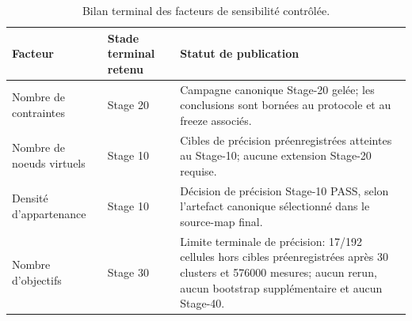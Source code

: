 \begin{table}[t]
\centering
\caption{Bilan terminal des facteurs de sensibilité contrôlée.}
\label{tab:sensitivity-final}
\small
\begin{tabular}{p{}p{}p{}}
\hline
Facteur & Stade terminal retenu & Statut de publication \\
\hline
Nombre de contraintes
& Stage 20
& Campagne canonique Stage-20 gelée; les conclusions sont bornées au protocole et au freeze associés. \\

Nombre de noeuds virtuels
& Stage 10
& Cibles de précision préenregistrées atteintes au Stage-10; aucune extension Stage-20 requise. \\

Densité d'appartenance
& Stage 10
& Décision de précision Stage-10 PASS, selon l'artefact canonique sélectionné dans le source-map final. \\

Nombre d'objectifs
& Stage 30
& Limite terminale de précision: 17/192 cellules hors cibles préenregistrées après 30 clusters et 576000 mesures; aucun rerun, aucun bootstrap supplémentaire et aucun Stage-40. \\
\hline
\end{tabular}
\end{table}
